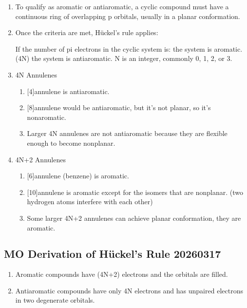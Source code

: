 \begin{enumerate}
    \item To qualify as aromatic or antiaromatic, a cyclic compound must have a continuous ring of overlapping p orbitals, usually in a planar conformation.
    \item Once the criteria are met, Hückel’s rule applies:
    
    If the number of pi electrons in the cyclic system is: the system is aromatic. (4N) the system is antiaromatic. N is an integer, commonly 0, 1, 2, or 3.
    
    \item 4N Annulenes
    \begin{enumerate}
        \item {[4]}annulene is antiaromatic.
        \item {[8]}annulene would be antiaromatic, but it’s not planar, so it’s nonaromatic.
        \item Larger 4N annulenes are not antiaromatic because they are flexible enough to become nonplanar.
    \end{enumerate}
    
    \item 4N+2 Annulenes
    \begin{enumerate}
        \item {[6]}annulene (benzene) is aromatic.
        \item {[10]}annulene is aromatic except for the isomers that are nonplanar. (two hydrogen atoms interfere with each other)
        \item Some larger 4N+2 annulenes can achieve planar conformation, they are aromatic.
    \end{enumerate}
    
\end{enumerate}

\subsection{MO Derivation of Hückel’s Rule 20260317}

\begin{enumerate}
    \item Aromatic compounds have (4N+2) electrons and the orbitals are filled.
    \item Antiaromatic compounds have only 4N electrons and has unpaired electrons in two degenerate orbitals.
\end{enumerate}


